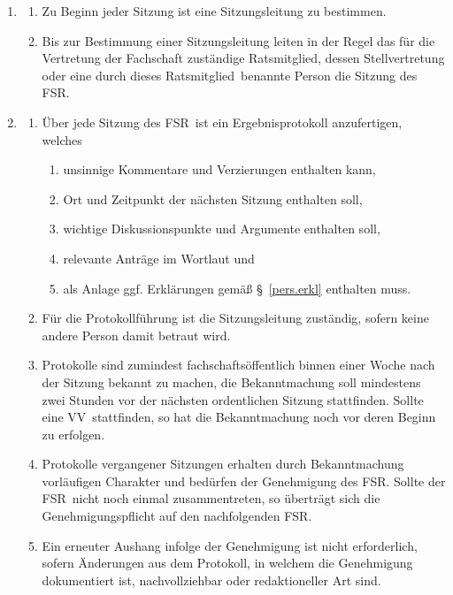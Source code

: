 \documentclass[a4paper, 12pt, ngerman]{article}
\newcommand{\vv}{VV}
\newcommand{\rat}{FSR}
\newcommand{\rates}{FSR}
\newcommand{\mitglied}{Ratsmitglied}
\begin{document}
\begin{enumerate}[leftmargin=0cm]
\begin{enumerate}[leftmargin=0cm]
	\end{enumerate}
	
	\item {}\label{sitzungsleitung}
	
	\begin{enumerate}[leftmargin=0cm]
	\item Zu Beginn jeder Sitzung ist eine Sitzungsleitung zu bestimmen. 
	\item Bis zur Bestimmung einer Sitzungsleitung leiten in der Regel das für die Vertretung der Fachschaft zuständige \mitglied , dessen Stellvertretung oder eine durch dieses \mitglied~benannte Person die Sitzung des \rates.
	\end{enumerate}
	
	\item {}\label{protokollfuhrung}
	
	\begin{enumerate}[leftmargin=0cm]
		\item Über jede Sitzung des \rates~ist ein Ergebnisprotokoll anzufertigen, welches
		\begin{enumerate}
			\item unsinnige Kommentare und Verzierungen enthalten kann,
			\item Ort und Zeitpunkt der nächsten Sitzung enthalten soll,
			\item wichtige Diskussionspunkte und Argumente enthalten soll,
			\item relevante Anträge im Wortlaut und
			\item als Anlage ggf. Erklärungen gemäß §~\ref{pers.erkl} enthalten muss.
		\end{enumerate}
		\item Für die Protokollführung
		ist die Sitzungsleitung zuständig, sofern keine andere Person damit betraut wird.		
		\item Protokolle sind zumindest fachschaftsöffentlich binnen einer Woche nach der Sitzung bekannt zu machen, die Bekanntmachung soll mindestens zwei Stunden vor der nächsten ordentlichen Sitzung stattfinden. Sollte eine \vv~stattfinden, so hat die Bekanntmachung noch vor deren Beginn zu erfolgen.
		\item Protokolle vergangener Sitzungen erhalten durch Bekanntmachung vorläufigen Charakter und bedürfen der Genehmigung des \rates. Sollte der \rat~nicht noch einmal zusammentreten, so überträgt sich die Genehmigungspflicht auf den nachfolgenden \rat.
		\item Ein erneuter Aushang infolge der Genehmigung ist nicht erforderlich, sofern Änderungen aus dem Protokoll, in welchem die Genehmigung dokumentiert ist, nachvollziehbar oder redaktioneller Art sind.
	\end{enumerate}


\end{enumerate}
\end{document}
